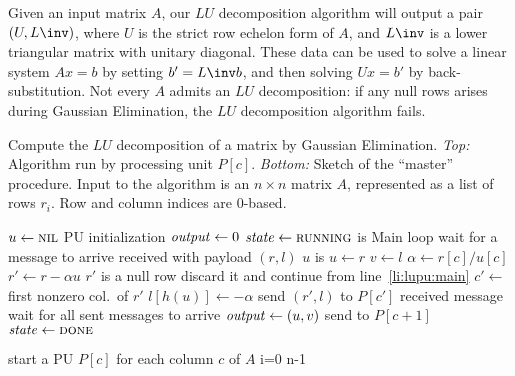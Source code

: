 Given an input matrix $A$, our $LU$ decomposition algorithm will
output a pair $(U, L\inv)$, where $U$ is the strict row echelon form
of $A$, and $L\inv$ is a lower triangular matrix with unitary
diagonal.  These data can be used to solve a linear system $Ax = b$ by
setting $b' = L\inv b$, and then solving $Ux = b'$ by
back-substitution.  Not every $A$ admits an $LU$
decomposition\cite{okunev+johnson:2005}: if any null rows arises
during Gaussian Elimination, the $LU$ decomposition algorithm fails.
\begin{Algorithm}
  \caption{Compute the $LU$ decomposition of a matrix by Gaussian
    Elimination. \emph{Top:} Algorithm run by processing unit $P[c]$.
    \emph{Bottom:} Sketch of the ``master'' procedure.  Input to the
    algorithm is an $n \times n$ matrix $A$, represented as a list of
    rows $r_i$. Row and column indices are $0$-based.}
  \label{alg:lu}
  \begin{codebox}
    \li $u \gets \textnormal{\scshape nil}$ \RComment PU initialization
    \li $\id{output} \gets 0$
    \li $\id{state} \gets \const{running}$
    \li \While {} is  
    \RComment Main loop
    \li \Do wait for a message to arrive              \label{li:lupu:main}
    \li   \If received  with payload $(r,l)$
    \li   \Then
    \li     \If $u$ is \nil
    \li     \Then 
              $u \gets r$ 
    \li       $v \gets l$
    \li     \Else                                     \label{li:lupu:elimination}
              $\alpha \gets r[c] / u[c]$
    \li       $r' \gets r - \alpha u$
    \li       \If $r'$ is a null row 
    \li       \Then
                discard it and continue from line~\ref{li:lupu:main}
              \End %
    \li       $c' \gets$ first nonzero col.~of $r'$
    \li       $l[h(u)] \gets -\alpha$
    \li       send $(r', l)$ to $P[c']$
            \End
    \li   \ElseIf received message 
    \li   \Then 
            wait for all sent messages to arrive
    \li     $\id{output} \gets (u, v)$                \label{li:lupu:result}
    \li     send  to $P[c+1]$
    \li     $\id{state} \gets \const{done}$
          \End%
        \End%
    \li \Return {}
    \end{codebox}
    \begin{codebox}
    \li start a PU $P[c]$ for each column $c$ of $A$  \label{li:lumaster:start}
    \li \For i=0 \To n-1                              \label{li:lumaster:read1}

\end{codebox}
\end{Algorithm}
